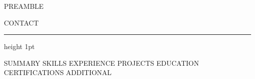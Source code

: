 %
{{PREAMBLE}}

\renewcommand{\familydefault}{\sfdefault}

\renewcommand{\cvsectionfont}[1]{{\normalsize\bfseries\color{cvaccent} #1}}
\renewcommand{\cvsectionrule}{\vspace{1.5pt}{\color{cvaccent!35}\hrule height 0.8pt}}
\renewcommand{\cvdatefont}[1]{{\footnotesize\color{cvmuted} #1}}
\renewcommand{\cvmetafont}[1]{{\footnotesize\color{cvmuted} #1}}

\renewcommand{\cvheader}[2]{%
  \cvsplit{{\fontsize{19}{22}\selectfont\bfseries #1}}%
          {\parbox[b]{0.52\linewidth}{\raggedleft\footnotesize\color{cvmuted} #2}}%
  \vspace{3pt}%
  {\color{cvaccent}\hrule height 1pt}%
  \vspace{1pt}%
}



\cvheader{ {{NAME}} }{ {{CONTACT}} }

{{SUMMARY}}
{{SKILLS}}
{{EXPERIENCE}}
{{PROJECTS}}
{{EDUCATION}}
{{CERTIFICATIONS}}
{{ADDITIONAL}}


